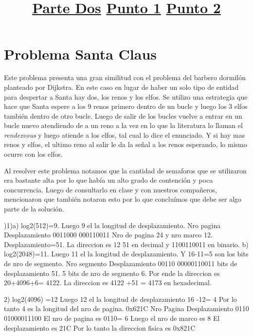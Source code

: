 \documentclass[11pt]{article} %
\begin{document}
\section{Problema Santa Claus}
Este problema presenta una gran similitud con el problema del barbero dormilón planteado por Dijkstra. En este caso en lugar de haber un solo tipo de entidad para despertar a Santa hay dos, los renos y los elfos. Se utilizo una estrategia que hace que Santa espere a los 9 renos primero dentro de un bucle y luego los 3 elfos también dentro de otro bucle. Luego de salir de los bucles vuelve a entrar en un bucle nuevo atendiendo de a un reno a la vez en lo que la literatura lo llaman el \textit{rendezvous} y luego atiende a los elfos, tal cual lo dice el enunciado. Y si hay mas renos y elfos, el ultimo reno al salir le da la señal a los renos esperando, lo mismo ocurre con los elfos.

Al resolver este problema notamos que la cantidad de semaforos que se utilizaron era bastante alta por lo que había un alto grado de contención y poca concurrencia. Luego de consultarlo en clase y con nuestros compañeros, mencionaron que también notaron esto por lo que concluímos que debe ser algo parte de la solución.


\hfill \break
\title{\huge \underline{Parte Dos}}
\hfill \break
\title{ \underline{Punto 1}}
\hfill {})1)a)
log2(512)=9.
\hfill \break
Luego 9 el la longitud de desplazamiento.
\hfill \break
\hfill \break
Nro pagina          Desplazamiento
0011000                 000110011
\hfill \break
Nro de pagina 24 y nro marco 12.
Desplazamiento=51.
\hfill \break
La direccion es
12 51 en decimal y
1100110011 en binario.
\hfill \break
\hfill \break
b)
log2(2048)=11.
\hfill \break
Luego 11 el la longitud de desplazamiento.
Y 16-11=5 son los bits de nro de segmento.
\hfill \break
\hfill \break
Nro segmento    Desplazamiento
00110           00000110011
\hfill {} bits de desplazamiento 51.
5 bits de nro de segmento 6.
\hfill \break
Por ende la direccion es 20+4096+6= 4122.
La direccion es 4122 +51 = 4173 en hexadecimal.

\hfill \break
\title{ \underline{Punto 2}}

2) log2(4096) =12
\hfill \break
Luego 12 el la longitud de desplazamiento
16 -12= 4
\hfill \break
Por lo tanto 4 es la longitud del nro de pagina.
\hfill \break
0x621C
Nro Pagina      Desplazamiento
0110            01000011100
\hfill \break
El nro de pagina es 0110= 6
Luego el nro de marco es 8
\hfill \break
El desplazamiento es 21C
\hfill \break
Por lo tanto la direccion fisica es 0x821C
\hfill \break
\end{document}
